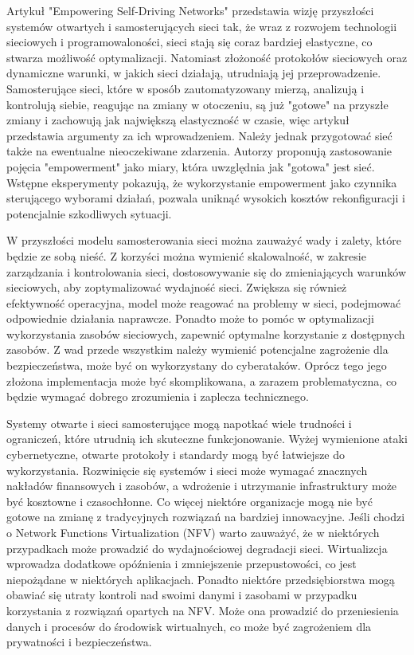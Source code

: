 \documentclass[sn-mathphys,Numbered]{sn-jnl}
\theoremstyle{thmstyleone}%
\theoremstyle{thmstyletwo}%
\theoremstyle{thmstylethree}%
\begin{document}
Artykuł "Empowering Self-Driving Networks" przedstawia wizję przyszłości systemów otwartych i samosterujących sieci tak, że wraz z rozwojem technologii sieciowych i programowaloności, sieci stają się coraz bardziej elastyczne, co stwarza możliwość optymalizacji. Natomiast złożoność protokołów sieciowych oraz dynamiczne warunki, w jakich sieci działają, utrudniają jej przeprowadzenie. Samosterujące sieci, które w sposób zautomatyzowany mierzą, analizują i kontrolują siebie, reagując na zmiany w otoczeniu, są już "gotowe" na przyszłe zmiany  i zachowują jak największą elastyczność w czasie, więc artykuł przedstawia argumenty za ich wprowadzeniem. Należy jednak przygotować sieć także na ewentualne nieoczekiwane zdarzenia. Autorzy proponują zastosowanie pojęcia "empowerment" jako miary, która uwzględnia jak "gotowa" jest sieć. Wstępne eksperymenty pokazują, że wykorzystanie empowerment jako czynnika sterującego wyborami działań, pozwala uniknąć wysokich kosztów rekonfiguracji i potencjalnie szkodliwych sytuacji\cite{kalmbach_empowering_2018-1}.

W przyszłości modelu samosterowania sieci można zauważyć wady i zalety, które będzie ze sobą nieść. Z korzyści można wymienić skalowalność, w zakresie zarządzania i kontrolowania sieci, dostosowywanie się do zmieniających warunków sieciowych, aby zoptymalizować wydajność sieci. Zwiększa się również efektywność operacyjna, model może reagować na problemy w sieci, podejmować odpowiednie działania naprawcze. Ponadto może to pomóc w optymalizacji wykorzystania zasobów sieciowych, zapewnić optymalne korzystanie z dostępnych zasobów. Z wad przede wszystkim należy wymienić potencjalne zagrożenie dla bezpieczeństwa, może być on wykorzystany do cyberataków. Oprócz tego jego złożona implementacja może być skomplikowana, a zarazem problematyczna, co będzie wymagać dobrego zrozumienia i zaplecza technicznego\cite{montenegro_open-source_2022-2}.

Systemy otwarte i sieci samosterujące mogą napotkać wiele trudności i ograniczeń, które utrudnią ich skuteczne funkcjonowanie. Wyżej wymienione ataki cybernetyczne, otwarte protokoły i standardy mogą być łatwiejsze do wykorzystania. Rozwinięcie się systemów i sieci może wymagać znacznych nakładów finansowych i zasobów, a wdrożenie i utrzymanie infrastruktury może być kosztowne i czasochłonne. Co więcej niektóre organizacje mogą nie być gotowe na zmianę z tradycyjnych rozwiązań na bardziej innowacyjne. Jeśli chodzi o Network Functions Virtualization (NFV) warto zauważyć, że w niektórych przypadkach może prowadzić do wydajnościowej degradacji sieci. Wirtualizcja wprowadza dodatkowe opóźnienia i zmniejszenie przepustowości, co jest niepożądane w niektórych aplikacjach. Ponadto niektóre przedsiębiorstwa mogą obawiać się utraty kontroli nad swoimi danymi i zasobami w przypadku korzystania z rozwiązań opartych na NFV. Może ona prowadzić do przeniesienia danych i procesów do środowisk wirtualnych, co może być zagrożeniem dla prywatności i bezpieczeństwa. 
\end{document}
